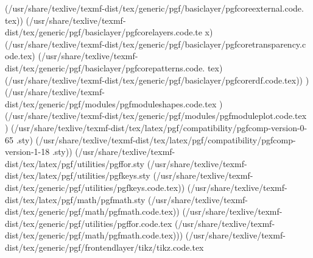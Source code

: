 (/usr/share/texlive/texmf-dist/tex/generic/pgf/basiclayer/pgfcoreexternal.code.
tex))
(/usr/share/texlive/texmf-dist/tex/generic/pgf/basiclayer/pgfcorelayers.code.te
x)
(/usr/share/texlive/texmf-dist/tex/generic/pgf/basiclayer/pgfcoretransparency.c
ode.tex)
(/usr/share/texlive/texmf-dist/tex/generic/pgf/basiclayer/pgfcorepatterns.code.
tex)
(/usr/share/texlive/texmf-dist/tex/generic/pgf/basiclayer/pgfcorerdf.code.tex))
)
(/usr/share/texlive/texmf-dist/tex/generic/pgf/modules/pgfmoduleshapes.code.tex
) (/usr/share/texlive/texmf-dist/tex/generic/pgf/modules/pgfmoduleplot.code.tex
)
(/usr/share/texlive/texmf-dist/tex/latex/pgf/compatibility/pgfcomp-version-0-65
.sty)
(/usr/share/texlive/texmf-dist/tex/latex/pgf/compatibility/pgfcomp-version-1-18
.sty)) (/usr/share/texlive/texmf-dist/tex/latex/pgf/utilities/pgffor.sty
(/usr/share/texlive/texmf-dist/tex/latex/pgf/utilities/pgfkeys.sty
(/usr/share/texlive/texmf-dist/tex/generic/pgf/utilities/pgfkeys.code.tex))
(/usr/share/texlive/texmf-dist/tex/latex/pgf/math/pgfmath.sty
(/usr/share/texlive/texmf-dist/tex/generic/pgf/math/pgfmath.code.tex))
(/usr/share/texlive/texmf-dist/tex/generic/pgf/utilities/pgffor.code.tex
(/usr/share/texlive/texmf-dist/tex/generic/pgf/math/pgfmath.code.tex)))
(/usr/share/texlive/texmf-dist/tex/generic/pgf/frontendlayer/tikz/tikz.code.tex


